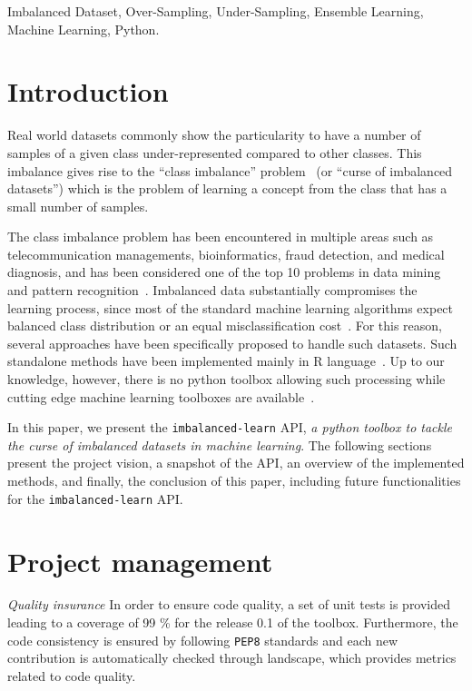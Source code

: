 \documentclass[twoside,11pt]{article}
\begin{document}
\begin{keywords}
Imbalanced Dataset, Over-Sampling, Under-Sampling, Ensemble Learning, Machine Learning, Python.
\end{keywords}

\section{Introduction}

Real world datasets commonly show the particularity to have a number of samples of a given class under-represented compared to other classes.
This imbalance gives rise to the ``class imbalance'' problem~\citep{prati2009data} (or ``curse of imbalanced datasets'')
which is the problem of learning a concept from the class that has a small number of samples.

The class imbalance problem has been encountered in multiple areas such as 
telecommunication managements, bioinformatics, fraud detection, and medical diagnosis,
and has been considered one of the top 10 problems in data mining and 
pattern recognition~\citep{yang200610,rastgoo2016tackling}. 
Imbalanced data substantially compromises the learning process, since most of the 
standard machine learning algorithms expect balanced class distribution or an 
equal misclassification cost~\citep{he2009learning}. For this reason, several
approaches have been specifically proposed to handle such datasets.
Such standalone methods have been implemented mainly in R language~\citep{torgo2010data,kuhn2015caret,dal2013racing}.
Up to our knowledge, however, there is no python toolbox allowing such processing while cutting edge machine learning toolboxes are available~\citep{pedregosa2011scikit,sonnenburg2010shogun}.

In this paper, we present the \texttt{imbalanced-learn} API, 
\textit{a python toolbox to tackle the curse of imbalanced datasets
in machine learning}. The following sections present the project vision, a snapshot of the API, an overview of the implemented methods,
and finally, the conclusion of this paper, including future functionalities
for the \texttt{imbalanced-learn} API.

\section{Project management}

\noindent\textit{Quality insurance} In order to ensure code quality, a set of unit tests is provided leading to a coverage of 99 \% for the release 0.1 of the toolbox.
Furthermore, the code consistency is ensured by following \texttt{PEP8} standards and each new contribution is automatically checked through landscape, which provides metrics related to code quality.
\end{document}
